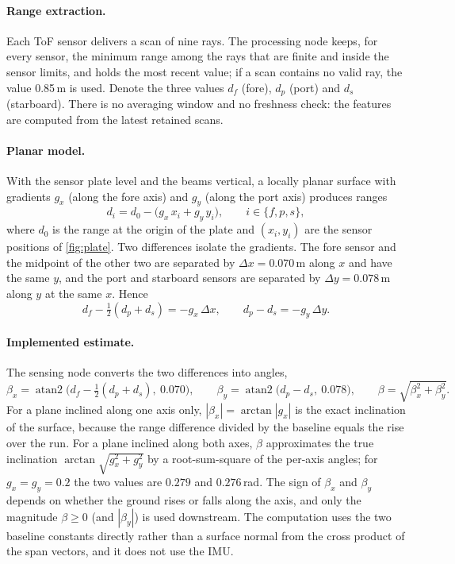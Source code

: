 \documentclass[11pt,a4paper]{article}
\begin{document}
\paragraph{Range extraction.} Each ToF sensor delivers a scan of nine rays. The processing node keeps, for every sensor, the minimum range among the rays that are finite and inside the sensor limits, and holds the most recent value; if a scan contains no valid ray, the value 0.85\,m is used. Denote the three values $d_f$ (fore), $d_p$ (port) and $d_s$ (starboard). There is no averaging window and no freshness check: the features are computed from the latest retained scans.
 
\paragraph{Planar model.} With the sensor plate level and the beams vertical, a locally planar surface with gradients $g_x$ (along the fore axis) and $g_y$ (along the port axis) produces ranges
\begin{equation}
d_i=d_0-\bigl(g_x\,x_i+g_y\,y_i\bigr),\qquad i\in\{f,p,s\},
\label{eq:plane}
\end{equation}
where $d_0$ is the range at the origin of the plate and $(x_i,y_i)$ are the sensor positions of \cref{fig:plate}. Two differences isolate the gradients. The fore sensor and the midpoint of the other two are separated by $\Delta x=0.070$\,m along $x$ and have the same $y$, and the port and starboard sensors are separated by $\Delta y=0.078$\,m along $y$ at the same $x$. Hence
\begin{equation}
d_f-\tfrac12(d_p+d_s)=-g_x\,\Delta x,\qquad d_p-d_s=-g_y\,\Delta y .
\end{equation}
 
\paragraph{Implemented estimate.} The sensing node converts the two differences into angles,
\begin{equation}
\beta_x=\operatorname{atan2}\!\bigl(d_f-\tfrac12(d_p+d_s),\ 0.070\bigr),\qquad
\beta_y=\operatorname{atan2}\!\bigl(d_p-d_s,\ 0.078\bigr),\qquad
\beta=\sqrt{\beta_x^{2}+\beta_y^{2}} .
\label{eq:slope}
\end{equation}
For a plane inclined along one axis only, $|\beta_x|=\arctan|g_x|$ is the exact inclination of the surface, because the range difference divided by the baseline equals the rise over the run. For a plane inclined along both axes, $\beta$ approximates the true inclination $\arctan\sqrt{g_x^2+g_y^2}$ by a root-sum-square of the per-axis angles; for $g_x=g_y=0.2$ the two values are $0.279$ and $0.276$\,rad. The sign of $\beta_x$ and $\beta_y$ depends on whether the ground rises or falls along the axis, and only the magnitude $\beta\ge0$ (and $|\beta_y|$) is used downstream. The computation uses the two baseline constants directly rather than a surface normal from the cross product of the span vectors, and it does not use the IMU.
 
\end{document}
